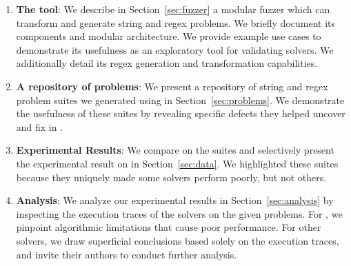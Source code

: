         \begin{enumerate}
            \item \textbf{The \fuzzer{} tool}: We describe in Section~\ref{sec:fuzzer} a modular fuzzer which can transform and generate \smtfull{} string and regex problems. We briefly document its components and modular architecture. We provide example use cases to demonstrate its usefulness as an exploratory tool for validating solvers. We additionally detail its regex generation and transformation capabilities.
            \item \textbf{A repository of \smtfull{} problems}: We present a repository of \smtfull{} string and regex problem suites we generated using \fuzzer{} in Section~\ref{sec:problems}. We demonstrate the usefulness of these suites by revealing specific defects they helped uncover and fix in \us{}.
            \item \textbf{Experimental Results}: We compare \theSolvers{} on the \fuzzer{} suites and selectively present the experimental result on \theSuites{} in Section~\ref{sec:data}. We highlighted these suites because they uniquely made some solvers perform poorly, but not others.
            \item \textbf{Analysis}: We analyze our experimental results in Section~\ref{sec:analysis} by inspecting the execution traces of the solvers on the given problems. For \us{}, we pinpoint algorithmic limitations that cause poor performance. For other solvers, we draw superficial conclusions based solely on the execution traces, and invite their authors to conduct further analysis.
        \end{enumerate}

